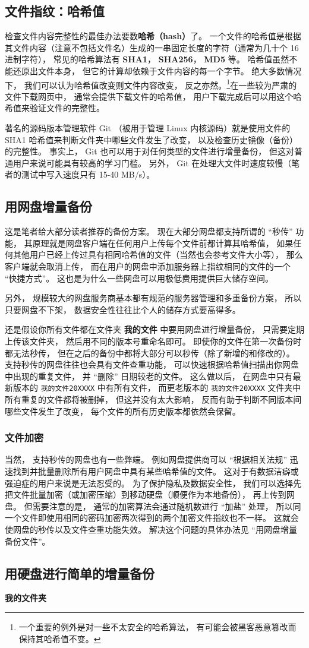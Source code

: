 \subsection{文件指纹：哈希值}
检查文件内容完整性的最佳办法要数\textbf{哈希（hash）}了。 一个文件的哈希值是根据其文件内容（注意不包括文件名）生成的一串固定长度的字符（通常为几十个 16 进制字符）， 常见的哈希算法有 \textbf{SHA1}， \textbf{SHA256}， \textbf{MD5} 等。 哈希值虽然不能还原出文件本身， 但它的计算却依赖于文件内容的每一个字节。 绝大多数情况下， 我们可以认为哈希值改变则文件内容改变， 反之亦然。\footnote{一个重要的例外是对一些不太安全的哈希算法， 有可能会被黑客恶意篡改而保持其哈希值不变。}在一些较为严肃的文件下载网页中， 通常会提供下载文件的哈希值， 用户下载完成后可以用这个哈希值来验证文件的完整性。

著名的源码版本管理软件 Git （被用于管理 Linux 内核源码）就是使用文件的 SHA1 哈希值来判断文件夹中哪些文件发生了改变， 以及检查历史镜像（备份）的完整性。 事实上， Git 也可以用于对任何类型的文件进行增量备份， 但这对普通用户来说可能具有较高的学习门槛。 另外， Git 在处理大文件时速度较慢（笔者的测试中写入速度只有 15-40 MB/s）。

\subsection{用网盘增量备份}
这是笔者给大部分读者推荐的备份方案。 现在大部分网盘都支持所谓的 “秒传” 功能， 其原理就是网盘客户端在任何用户上传每个文件前都计算其哈希值， 如果任何其他用户已经上传过具有相同哈希值的文件（当然也会参考文件大小等）， 那么客户端就会取消上传， 而在用户的网盘中添加服务器上指纹相同的文件的一个 “快捷方式”。 这也是为什么一些网盘可以用极低费用提供巨大储存空间。

另外， 规模较大的网盘服务商基本都有规范的服务器管理和多重备份方案， 所以只要网盘不下架， 数据安全性往往比个人的储存方式要高得多。

还是假设你所有文件都在文件夹 \textbf{我的文件} 中要用网盘进行增量备份， 只需要定期上传该文件夹， 然后用不同的版本号重命名即可。 即使你的文件在第一次备份时都无法秒传， 但在之后的备份中都将大部分可以秒传（除了新增的和修改的）。 支持秒传的网盘往往也会具有文件查重功能， 可以快速根据哈希值扫描出你网盘中出现的重复文件， 并 “删除” 日期较老的文件。 这么做以后， 在网盘中只有最新版本的 \verb|我的文件20XXXX| 中有所有文件， 而更老版本的 \verb|我的文件20XXXX| 文件夹中所有重复的文件都将被删掉， 但这并没有太大影响， 反而有助于判断不同版本间哪些文件发生了改变， 每个文件的所有历史版本都依然会保留。

\subsubsection{文件加密}
当然， 支持秒传的网盘也有一些弊端。 例如网盘提供商可以 “根据相关法规” 迅速找到并批量删除所有用户网盘中具有某些哈希值的文件。 这对于有数据洁癖或强迫症的用户来说是无法忍受的。 为了保护隐私及数据安全性， 我们可以选择先把文件批量加密（或加密压缩）到移动硬盘（顺便作为本地备份）， 再上传到网盘。 但需要注意的是， 通常的加密算法会通过随机数进行 “加盐” 处理， 所以同一个文件即使用相同的密码加密两次得到的两个加密文件指纹也不一样。 这就会使网盘的秒传以及文件查重功能失效。 解决这个问题的具体办法见 “用网盘增量备份文件”。

\subsection{用硬盘进行简单的增量备份}
\textbf{我的文件夹}

